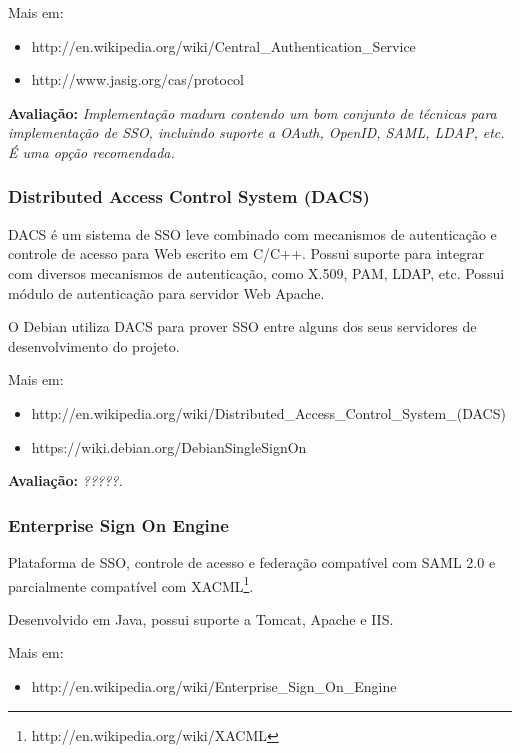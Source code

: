 \documentclass[11pt]{article}
\begin{document}

Mais em:
\begin{itemize}
  \item{http://en.wikipedia.org/wiki/Central\_Authentication\_Service}
  \item{http://www.jasig.org/cas/protocol}
\end{itemize}

{\bf Avaliação:} {\it Implementação madura contendo um bom conjunto de
técnicas para implementação de SSO, incluindo suporte a OAuth, OpenID, SAML, LDAP,
etc. É uma opção recomendada.}

\subsubsection{Distributed Access Control System (DACS)}

DACS é um sistema de SSO leve combinado com mecanismos de autenticação e
controle de acesso para Web escrito em C/C++. Possui suporte para integrar com
diversos mecanismos de autenticação, como X.509, PAM, LDAP, etc. Possui módulo
de autenticação para servidor Web Apache.


O Debian utiliza DACS para prover SSO entre alguns dos seus servidores de
desenvolvimento do projeto.

Mais em:
\begin{itemize}
  \item{http://en.wikipedia.org/wiki/Distributed\_Access\_Control\_System\_(DACS)}
  \item{https://wiki.debian.org/DebianSingleSignOn}
\end{itemize}

{\bf Avaliação:} {\it ?????.}

\subsubsection{Enterprise Sign On Engine}

Plataforma de SSO, controle de acesso e federação compatível com SAML 2.0
e parcialmente compatível com
XACML\footnote{http://en.wikipedia.org/wiki/XACML}.

Desenvolvido em Java, possui suporte a Tomcat, Apache e IIS.

Mais em:
\begin{itemize}
  \item{http://en.wikipedia.org/wiki/Enterprise\_Sign\_On\_Engine}
\end{itemize}
\end{document}
